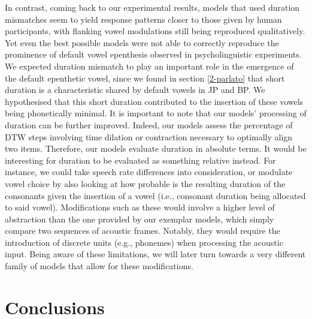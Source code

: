 In contrast, coming back to our experimental results, models that used duration mismatches seem to yield response patterns closer to those given by human participants, with flanking vowel modulations still being reproduced qualitatively. Yet even the best possible models were not able to correctly reproduce the prominence of default vowel epenthesis observed in psycholinguistic experiments. We expected duration mismatch to play an important role in the emergence of the default epenthetic vowel, since we found in section \ref{2-parlato} that short duration is a characteristic shared by default vowels in JP and BP. We hypothesised that this short duration contributed to the insertion of these vowels being phonetically minimal.
It is important to note that our models' processing of duration can be further improved. Indeed, our models assess the percentage of DTW steps involving time dilation or contraction necessary to optimally align two items. Therefore, our models evaluate duration in absolute terms. It would be interesting for duration to be evaluated as something relative instead. For instance, we could take speech rate differences into consideration, or modulate vowel choice by also looking at how probable is the resulting duration of the consonants given the insertion of a vowel (i.e., consonant duration being allocated to said vowel). Modifications such as these would involve a higher level of abstraction than the one provided by our exemplar models, which simply compare two sequences of acoustic frames. Notably, they would require the introduction of discrete units (e.g., phonemes) when processing the acoustic input. Being aware of these limitations, we will later turn towards a very different family of models that allow for these modifications.

\section{Conclusions}


